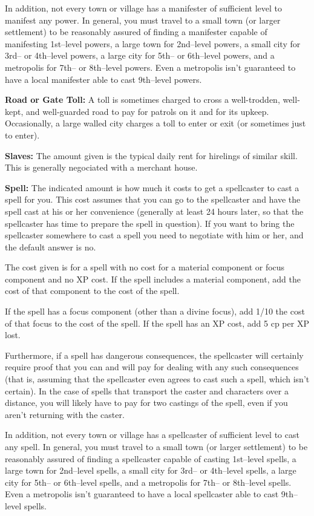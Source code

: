 In addition, not every town or village has a manifester of sufficient level to manifest any power. In general, you must travel to a small town (or larger settlement) to be reasonably assured of finding a manifester capable of manifesting 1st--level powers, a large town for 2nd--level powers, a small city for 3rd-- or 4th--level powers, a large city for 5th-- or 6th--level powers, and a metropolis for 7th-- or 8th--level powers. Even a metropolis isn't guaranteed to have a local manifester able to cast 9th--level powers.

\textbf{Road or Gate Toll:} A toll is sometimes charged to cross a well-trodden, well-kept, and well-guarded road to pay for patrols on it and for its upkeep. Occasionally, a large walled city charges a toll to enter or exit (or sometimes just to enter).

\textbf{Slaves:} The amount given is the typical daily rent for hirelings of similar skill. This is generally negociated with a merchant house.

\textbf{Spell:} The indicated amount is how much it costs to get a spellcaster to cast a spell for you. This cost assumes that you can go to the spellcaster and have the spell cast at his or her convenience (generally at least 24 hours later, so that the spellcaster has time to prepare the spell in question). If you want to bring the spellcaster somewhere to cast a spell you need to negotiate with him or her, and the default answer is no.

The cost given is for a spell with no cost for a material component or focus component and no XP cost. If the spell includes a material component, add the cost of that component to the cost of the spell.

If the spell has a focus component (other than a divine focus), add 1/10 the cost of that focus to the cost of the spell. If the spell has an XP cost, add 5 cp per XP lost.

Furthermore, if a spell has dangerous consequences, the spellcaster will certainly require proof that you can and will pay for dealing with any such consequences (that is, assuming that the spellcaster even agrees to cast such a spell, which isn't certain). In the case of spells that transport the caster and characters over a distance, you will likely have to pay for two castings of the spell, even if you aren't returning with the caster.

In addition, not every town or village has a spellcaster of sufficient level to cast any spell. In general, you must travel to a small town (or larger settlement) to be reasonably assured of finding a spellcaster capable of casting 1st--level spells, a large town for 2nd--level spells, a small city for 3rd-- or 4th--level spells, a large city for 5th-- or 6th--level spells, and a metropolis for 7th-- or 8th--level spells. Even a metropolis isn't guaranteed to have a local spellcaster able to cast 9th--level spells.